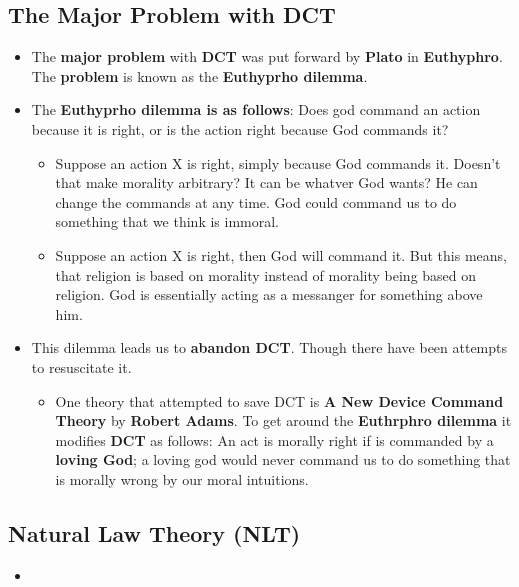 \documentclass[16pt]{article}
\begin{document}
    \subsection*{The Major Problem with DCT}
    \begin{itemize}
        \item The \textbf{major problem} with \textbf{DCT} was put forward by \textbf{Plato} in \textbf{Euthyphro}. The \textbf{problem} is known as the \textbf{Euthyprho dilemma}.
        \item The \textbf{Euthyprho dilemma is as follows}: Does god command an action because it is right, or is the action right because God commands it?
        \begin{itemize}
            \item Suppose an action X is right, simply because God commands it. Doesn't that make morality arbitrary? It can be whatver God wants? He can change the commands at any time. God could command us to do something that we think is immoral.
            \item Suppose an action X is right, then God will command it. But this means, that religion is based on morality instead of morality being based on religion. God is essentially acting as a messanger for something above him.
        \end{itemize}
        \item This dilemma leads us to \textbf{abandon DCT}. Though there have been attempts to resuscitate it.
        \begin{itemize}
            \item One theory that attempted to save DCT is \textbf{A New Device Command Theory} by \textbf{Robert Adams}. To get around the \textbf{Euthrphro dilemma} it modifies \textbf{DCT} as follows: An act is morally right if is commanded by a \textbf{loving God}; a loving god would never command us to do something that is morally wrong by our moral intuitions.
        \end{itemize}
    \end{itemize}    

    \subsection*{Natural Law Theory (NLT)}
    \begin{itemize}
        \item 
    \end{itemize}
\end{document}
